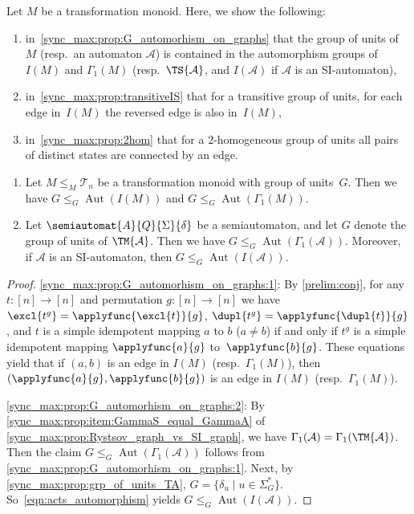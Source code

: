 
Let $M$ be a transformation monoid. 
Here, we show the following:
\begin{enumerate} 
\item in~\cref{sync_max:prop:G_automorhism_on_graphs} that the group of units of~$M$ (resp.~an automaton $\mathcal A$)
is contained in the automorphism groups of~$I(M)$ and $\Gamma_1(M)$ (resp.~$\TS{\mathcal A}$, and $I(\mathcal A)$ if
$\mathcal A$ is an SI-automaton), 

\item in~\cref{sync_max:prop:transitiveIS} that for a transitive group of units,
for each edge in~$I(M)$ the reversed edge is also in~$I(M)$,

\item in~\cref{sync_max:prop:2hom} that for a $2$-homogeneous group of units
all pairs of distinct states are connected by an edge.
\end{enumerate} 

\begin{proposition} \label{sync_max:prop:G_automorhism_on_graphs}	
	\begin{enumerate}
	\item \label{sync_max:prop:G_automorhism_on_graphs:1} Let $M \le_M \mathcal T_n$ be a transformation monoid with group of units~$G$.
	Then we have $G \le_G \operatorname{Aut}(I(M))$	and $G \le_G \operatorname{Aut}(\Gamma_1(M))$.
	
	\item \label{sync_max:prop:G_automorhism_on_graphs:2} Let $\semiautomat{A}{Q}{\Sigma}{\delta}$ be a semiautomaton, and let
	$G$ denote the group of units of $\TM{\mathcal A}$.
	Then we have
	$
	G \le_G \operatorname{Aut}(\Gamma_1(\mathcal A)).
	$
	Moreover, if $\mathcal A$ is an SI-automaton, then
	$
	G \le_G \operatorname{Aut}(I(\mathcal A)).
	$
	\end{enumerate}
\end{proposition}
\begin{proof} 
\ref{sync_max:prop:G_automorhism_on_graphs:1}: By \cref{prelim:conj}, for any $t \colon [n] \to [n]$
and permutation $g \colon [n] \to [n]$
we have $\excl{t^g} = \applyfunc{\excl{t}}{g}$,
$\dupl{t^g} = \applyfunc{\dupl{t}}{g}$,
and $t$ is a simple idempotent mapping $a$ to $b$ ($a \ne b$)
if and only if $t^g$ is a simple idempotent mapping $\applyfunc{a}{g}$ to~$\applyfunc{b}{g}$.
These equations yield that if $(a,b)$ is an edge in $I(M)$ (resp.~$\Gamma_1(M)$),
then $(\applyfunc{a}{g}, \applyfunc{b}{g})$ is an edge in $I(M)$ (resp.~$\Gamma_1(M)$).

\ref{sync_max:prop:G_automorhism_on_graphs:2}: By \cref{sync_max:prop:item:GammaS_equal_GammaA} of \cref{sync_max:prop:Rystsov_graph_vs_SI_graph},
we have $\Gamma_1(\mathcal A) = \Gamma_1(\TM{\mathcal A})$.
Then the claim $G \le_G \operatorname{Aut}(\Gamma_1(\mathcal A))$
follows from \cref{sync_max:prop:G_automorhism_on_graphs:1}.	
Next, by \cref{sync_max:prop:grp_of_units_TA},
$G = \{ \delta_u \mid u \in \Sigma_G^* \}$. So~\cref{eqn:acts_automorphism}
yields $G \le_G \operatorname{Aut}(I(\mathcal A))$.
\end{proof}


